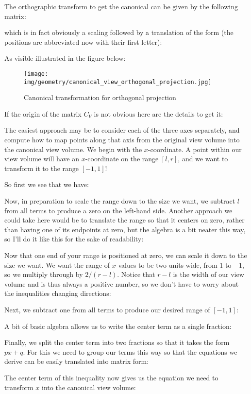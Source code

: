 	The orthographic transform to get the canonical can be given by the following matrix:
	
	which is in fact obviously a scaling followed by a translation of the form (the positions are abbreviated now with their first letter):
	
	As visible illustrated in the figure below:
	\begin{figure}[H]
		\centering
		\texttt{[image: img/geometry/canonical\_view\_orthogonal\_projection.jpg]}
		\caption[]{Canonical transformation for orthogonal projection}
	\end{figure}
	If the origin of the matrix $C_V$ is not obvious here are the details to get it:
	
	The easiest approach may be to consider each of the three axes separately, and compute how to map points along that axis from the original view volume into the canonical view volume. We begin with the $x$-coordinate. A point within our view volume will have an $x$-coordinate on the range $[l, r]$, and we want to transform it to the range $[-1, 1]$!

	So first we see that we have:
	
	Now, in preparation to scale the range down to the size we want, we subtract $l$ from all terms to produce a zero on the left-hand side. Another approach we could take here would be to translate the range so that it centers on zero, rather than having one of its endpoints at zero, but the algebra is a bit neater this way, so I'll do it like this for the sake of readability:
	
	Now that one end of your range is positioned at zero, we can scale it down to the size we want. We want the range of $x$-values to be two units wide, from $1$ to $-1$, so we multiply through by $2/(r - l)$. Notice that $r - l$ is the width of our view volume and is thus always a positive number, so we don't have to worry about the inequalities changing directions:
	
	Next, we subtract one from all terms to produce our desired range of $[-1, 1]$:
	
	A bit of basic algebra allows us to write the center term as a single fraction:
	
	Finally, we split the center term into two fractions so that it takes the form $px + q$. For this we need to group our terms this way so that the equations we derive can be easily translated into matrix form:
	
	The center term of this inequality now gives us the equation we need to transform $x$ into the canonical view volume:
	
